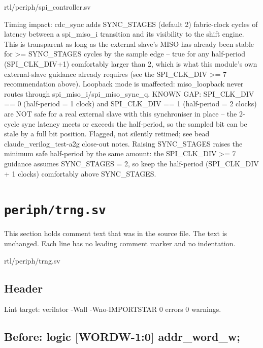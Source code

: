 \begin{relocated}{rtl/periph/spi_controller.sv}
\begin{textblock}
Timing impact: cdc_sync adds SYNC_STAGES (default 2) fabric-clock cycles of latency
between a spi_miso_i transition and its visibility to the shift
engine. This is transparent as long as the external slave's MISO has
already been stable for >= SYNC_STAGES cycles by the sample edge -- true for any
half-period (SPI_CLK_DIV+1) comfortably larger than 2, which is what
this module's own external-slave guidance already requires (see the
SPI_CLK_DIV >= 7 recommendation above). Loopback mode is unaffected:
miso_loopback never routes through spi_miso_i/spi_miso_sync_q.
KNOWN GAP: SPI_CLK_DIV == 0 (half-period = 1 clock) and SPI_CLK_DIV == 1
(half-period = 2 clocks) are NOT safe for a real external slave with
this synchroniser in place -- the 2-cycle sync latency meets or exceeds
the half-period, so the sampled bit can be stale by a full bit
position. Flagged, not silently retimed; see bead
claude_verilog_test-a2g close-out notes. Raising SYNC_STAGES raises the
minimum safe half-period by the same amount: the SPI_CLK_DIV >= 7
guidance assumes SYNC_STAGES = 2, so keep the half-period
(SPI_CLK_DIV + 1 clocks) comfortably above SYNC_STAGES.
\end{textblock}

\end{relocated}

\section{\texttt{periph/trng.sv}}\label{tm:mod:trng}

This section holds comment text that was in the source file. The text is unchanged. Each line has no leading comment marker and no indentation.

\begin{relocated}{rtl/periph/trng.sv}

\subsection*{Header}

\begin{textblock}
Lint target: verilator -Wall -Wno-IMPORTSTAR 0 errors 0 warnings.
\end{textblock}

\subsection*{Before: logic [WORDW-1:0] addr\_word\_w;}


\end{relocated}

